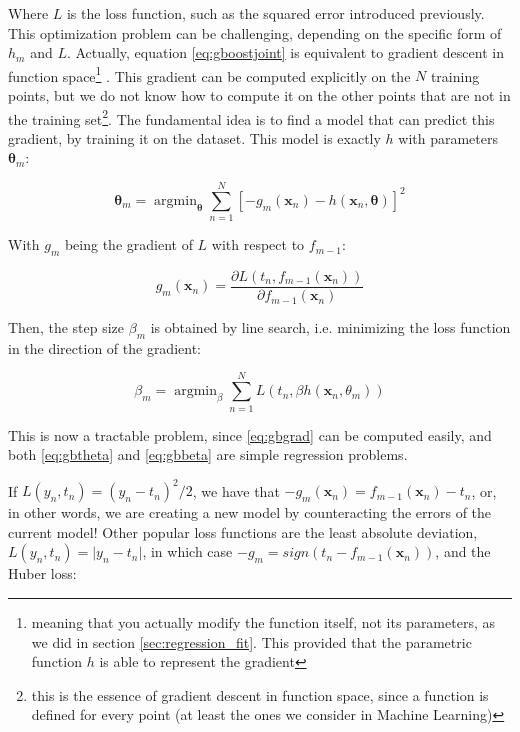 \documentclass[a4paper]{book}
\DeclareMathOperator*{\argmin}{argmin}
\begin{document}
Where $L$ is the loss function, such as the squared error introduced previously. This optimization problem can be challenging, depending on the specific form of $h_m$ and $L$. Actually, equation \ref{eq:gboostjoint} is equivalent to gradient descent in function space\footnote{meaning that you actually modify the function itself, not its parameters, as we did in section \ref{sec:regression_fit}. This provided that the parametric function $h$ is able to represent the gradient} \citep{boostinggd,greedyboosting}. This gradient can be computed explicitly on the $N$ training points, but we do not know how to compute it on the other points that are not in the training set\footnote{this is the essence of gradient descent in function space, since a function is defined for every point (at least the ones we consider in Machine Learning)}. The fundamental idea is to find a model that can predict this gradient, by training it on the dataset. This model is exactly $h$ with parameters $\bm\theta_m$:

\begin{equation}
\label{eq:gbtheta}
\bm\theta_m=\argmin_{\bm\theta}\sum_{n=1}^N \left[
-g_m(\bm x_n)-h(\bm x_n,\bm\theta)
\right]^2
\end{equation}

With $g_m$ being the gradient of $L$ with respect to $f_{m-1}$:

\begin{equation}
\label{eq:gbgrad}
g_m(\bm x_n)=\frac{\partial L(t_n,f_{m-1}(\bm x_n))}{\partial f_{m-1}(\bm x_n)}
\end{equation}

Then, the step size $\beta_m$ is obtained by line search, i.e. minimizing the loss function in the direction of the gradient:

\begin{equation}
\label{eq:gbbeta}
\beta_m=\argmin_{\beta}\sum_{n=1}^N L(t_n, \beta h(\bm x_n,\theta_m))
\end{equation}

This is now a tractable problem, since \ref{eq:gbgrad} can be computed easily, and both \ref{eq:gbtheta} and \ref{eq:gbbeta} are simple regression problems.

If $L(y_n,t_n)=(y_n-t_n)^2/2$, we have that $-g_m(\bm x_n)=f_{m-1}(\bm x_n)-t_n$, or, in other words, we are creating a new model by counteracting the errors of the current model! Other popular loss functions are the least absolute deviation, $L(y_n,t_n)=\vert y_n-t_n\vert$, in which case $-g_m=sign(t_n-f_{m-1}(\bm x_n))$, and the Huber loss:
\end{document}
